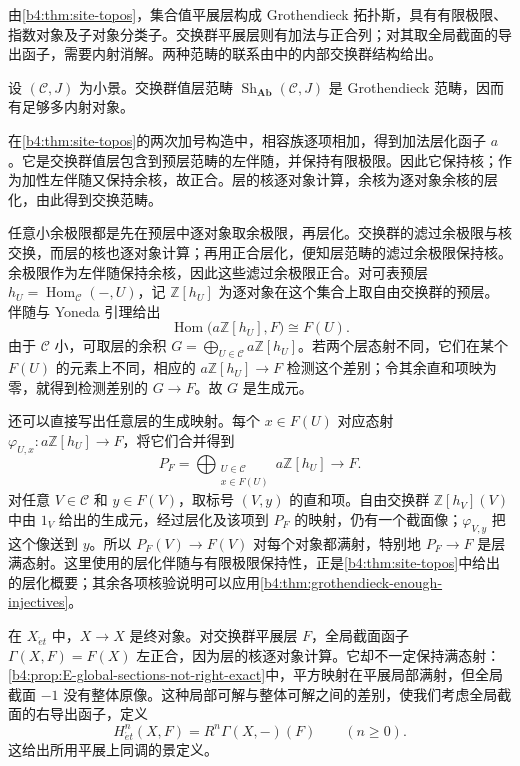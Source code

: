 由\cref{b4:thm:site-topos}，集合值平展层构成 Grothendieck 拓扑斯，具有有限极限、指数对象及子对象分类子。交换群平展层则有加法与正合列；对其取全局截面的导出函子，需要内射消解。两种范畴的联系由中的内部交换群结构给出。

\begin{proposition}\label{b4:prop:abelian-site-sheaves-grothendieck}
	设 \((\mathcal C,J)\) 为小景。交换群值层范畴 \(\operatorname{Sh}_{\mathbf{Ab}}(\mathcal C,J)\) 是 Grothendieck 范畴，因而有足够多内射对象。
\end{proposition}
\begin{proofsketch}
	在\cref{b4:thm:site-topos}的两次加号构造中，相容族逐项相加，得到加法层化函子 \(a\)。它是交换群值层包含到预层范畴的左伴随，并保持有限极限。因此它保持核；作为加性左伴随又保持余核，故正合。层的核逐对象计算，余核为逐对象余核的层化，由此得到交换范畴。

	任意小余极限都是先在预层中逐对象取余极限，再层化。交换群的滤过余极限与核交换，而层的核也逐对象计算；再用正合层化，便知层范畴的滤过余极限保持核。余极限作为左伴随保持余核，因此这些滤过余极限正合。对可表预层 \(h_U=\operatorname{Hom}_{\mathcal C}(-,U)\)，记 \(\mathbb Z[h_U]\) 为逐对象在这个集合上取自由交换群的预层。伴随与 Yoneda 引理给出
	\[
		\operatorname{Hom}\bigl(a\mathbb Z[h_U],F\bigr)\cong F(U).
	\]
	由于 \(\mathcal C\) 小，可取层的余积 \(G=\bigoplus_{U\in\mathcal C}a\mathbb Z[h_U]\)。若两个层态射不同，它们在某个 \(F(U)\) 的元素上不同，相应的 \(a\mathbb Z[h_U]\rightarrow F\) 检测这个差别；令其余直和项映为零，就得到检测差别的 \(G\rightarrow F\)。故 \(G\) 是生成元。

	还可以直接写出任意层的生成映射。每个 \(x\in F(U)\) 对应态射 \(\varphi_{U,x}:a\mathbb Z[h_U]\to F\)，将它们合并得到
	\[
		P_F=\bigoplus_{\substack{U\in\mathcal C\\x\in F(U)}}a\mathbb Z[h_U] \longrightarrow F.
	\]
	对任意 \(V\in\mathcal C\) 和 \(y\in F(V)\)，取标号 \((V,y)\) 的直和项。自由交换群 \(\mathbb Z[h_V](V)\) 中由 \(1_V\) 给出的生成元，经过层化及该项到 \(P_F\) 的映射，仍有一个截面像；\(\varphi_{V,y}\) 把这个像送到 \(y\)。所以 \(P_F(V)\to F(V)\) 对每个对象都满射，特别地 \(P_F\to F\) 是层满态射。这里使用的层化伴随与有限极限保持性，正是\cref{b4:thm:site-topos}中给出的层化概要；其余各项核验说明可以应用\cref{b4:thm:grothendieck-enough-injectives}。
\end{proofsketch}

在 \(X_{\acute{e}t}\) 中，\(X\rightarrow X\) 是终对象。对交换群平展层 \(F\)，全局截面函子 \(\Gamma(X,F)=F(X)\) 左正合，因为层的核逐对象计算。它却不一定保持满态射：\cref{b4:prop:E-global-sections-not-right-exact}中，平方映射在平展局部满射，但全局截面 \(-1\) 没有整体原像。这种局部可解与整体可解之间的差别，使我们考虑全局截面的右导出函子，定义
\[
	H^n_{\acute{e}t}(X,F)=R^n\Gamma(X,-)(F) \qquad(n\ge0).
\]
这给出所用平展上同调的景定义。

